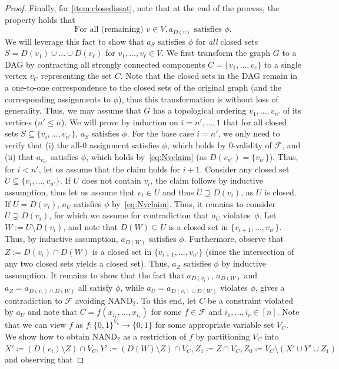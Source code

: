 \documentclass[10pt,a4paper]{article}
\theoremstyle{plain}
\newcommand{\NAND}{\mathrm{NAND}}
\newcommand{\confam}{\mathcal{F}}
\begin{document}
\begin{proof}
%
Finally, for \ref{item:closedissat}, note that at the end of the process, the property holds that
\begin{equation}\label{eq:Nvclaim}
\text{For all (remaining) } v\in V, a_{D(v)} \text{ satisfies } \phi.
\end{equation}
We will leverage this fact to show that $a_S$ satisfies $\phi$ for \emph{all} closed sets $S=D(v_1)\cup ... \cup D(v_\ell)$ for $v_1,\dots, v_\ell\in V$. We first transform the graph $G$ to a DAG by contracting all strongly connected components $C=\{v_1, \dots, v_c\}$ to a single vertex $v_C$ representing the set $C$. Note that the closed sets in the DAG remain in a one-to-one correspondence to the closed sets of the original graph (and the corresponding assignments to $\phi$), thus this transformation is without loss of generality. Thus, we may assume that $G$ has a topological ordering $v_1,\dots, v_{n'}$ of its vertices ($n'\le n$). We will prove by induction on $i=n', ..., 1$ that for all closed sets $S\subseteq \{v_i,...,v_{n'}\}$, $a_S$ satisfies $\phi$.
%
For the base case $i=n'$, we only need to verify that (i) the all-0 assignment satisfies $\phi$, which holds by 0-validity of $\confam$, and (ii) that $a_{v_{n'}}$ satisfies $\phi$, which holds by~\eqref{eq:Nvclaim} (as $D(v_{n'}) = \{v_{n'}\}$). Thus, for $i<n'$, let us assume that the claim holds for $i+1$. Consider any closed set $U\subseteq \{v_i, \dots, v_{n'}\}$. If $U$ does not contain $v_i$, the claim follows by inductive assumption, thus let us assume that $v_i \in U$ and thus $U\supseteq D(v_i)$, as $U$ is closed. If $U = D(v_i)$, $a_U$ satisfies $\phi$ by~\eqref{eq:Nvclaim}. Thus, it remains to consider $U \supsetneq D(v_i)$, for which we assume for contradiction that $a_U$ violates~$\phi$. Let $W := U\setminus D(v_i)$, and note that $D(W)\subseteq U$ is a closed set in $\{v_{i+1},\dots, v_{n'}\}$. Thus, by inductive assumption, $a_{D(W)}$ satisfies $\phi$. Furthermore, observe that $Z:=D(v_i)\cap D(W)$ is a closed set in $\{v_{i+1}, \dots, v_{n'}\}$ (since the intersection of any two closed sets yields a closed set). Thus, $a_Z$ satisfies $\phi$ by inductive assumption. It remains to show that the fact that $a_{D(v_i)}$, $a_{D(W)}$ and $a_Z=a_{D(v_i)\cap D(W)}$ all satisfy $\phi$, while $a_U=a_{D(v_i)\cup D(W)}$ violates $\phi$, gives a contradiction to $\confam$ avoiding $\NAND_2$.
%
To this end, let $C$ be a constraint violated by $a_U$ and note that $C=f(x_{i_1},\dots,x_{i_r})$ for some $f\in \confam$ and $i_1,\dots, i_r\in [n]$. Note that we can view $f$ as $f: \{0,1\}^{V_c} \to \{0,1\}$ for some appropriate variable set $V_C$. We show how to obtain $\NAND_2$ as a restriction of $f$ by partitioning $V_C$ into $X'\coloneqq (D(v_i) \setminus Z) \cap V_C, Y' \coloneqq (D(W)\setminus Z)\cap V_C, Z_1 \coloneqq Z\cap V_C, Z_0 \coloneqq V_C \setminus (X'\cup Y' \cup Z_1)$ and observing that 

\end{proof}
\end{document}

